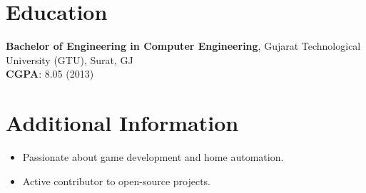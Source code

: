\documentclass[10pt,a4paper]{article}
\begin{document}
\section*{Education}
\textbf{Bachelor of Engineering in Computer Engineering}, Gujarat Technological University (GTU), Surat, GJ \\
\textbf{CGPA}: 8.05 (2013)

\section*{Additional Information}
\begin{itemize}[leftmargin=*]
  \item Passionate about game development and home automation.
  \item Active contributor to open-source projects.
\end{itemize}
\end{document}

